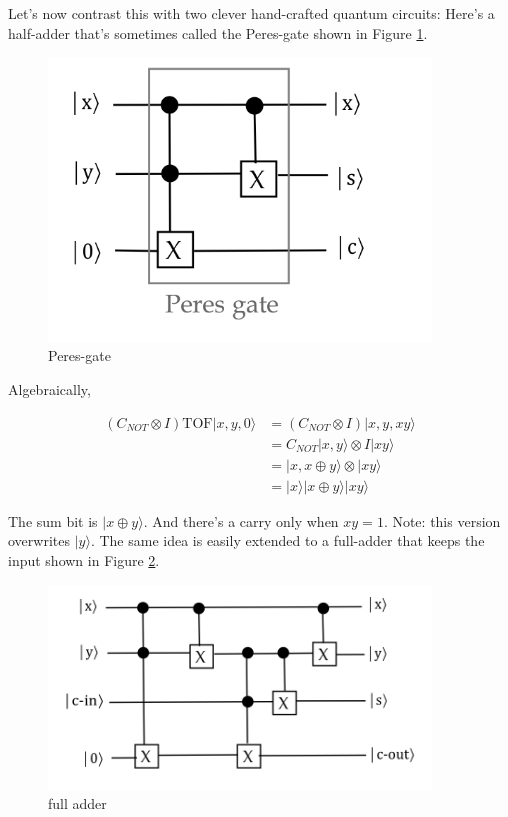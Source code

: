 \documentclass[main.tex]{subfiles}
\begin{document}
    Let's now contrast this with two clever hand-crafted quantum circuits: Here's a half-adder that's sometimes called the Peres-gate shown in Figure \ref{fig:25adder3}.
    
    \begin{figure}
        \centering
        \includegraphics[width=4in]{notes/figs/n10/25adder3.png}
        \caption{Peres-gate}
        \label{fig:25adder3}
    \end{figure}
    
    Algebraically,
    
    $$
    \begin{aligned}
    \left(C_{N O T} \otimes I\right) \mathrm{TOF}|x, y, 0\rangle &=\left(C_{N O T} \otimes I\right)|x, y, x y\rangle \\
    &=C_{N O T}|x, y\rangle \otimes I|x y\rangle \\
    &=|x, x \oplus y\rangle \otimes|x y\rangle \\
    &=|x\rangle|x \oplus y\rangle|x y\rangle
    \end{aligned}
    $$
    
    The sum bit is $|x \oplus y\rangle$. And there's a carry only when $x y=1$. Note: this version overwrites $|y\rangle$. The same idea is easily extended to a full-adder that keeps the input shown in Figure \ref{fig:26adder4}.
    
    \begin{figure}
        \centering
        \includegraphics[width=4in]{notes/figs/n10/26adder4.png}
        \caption{full adder}
        \label{fig:26adder4}
    \end{figure}
    
\end{document}
